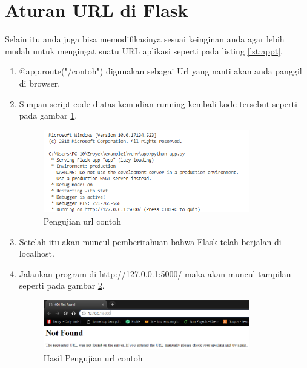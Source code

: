 \section{Aturan URL di Flask}
Selain itu anda juga bisa memodifikasinya sesuai keinginan anda agar lebih mudah untuk mengingat suatu URL aplikasi seperti pada listing \ref{lst:appt}.

\begin{enumerate}
\item @app.route("/contoh") digunakan sebagai Url yang nanti akan anda panggil di browser.
\item Simpan script code diatas kemudian running kembali kode tersebut seperti pada gambar \ref{fig:ujiurl}.
\begin{figure}[!htbp]
	\centerline{\includegraphics[width=0.85\textwidth]{figures/9/ujiurl.PNG}}
	\caption{Pengujian url contoh}
	\label{fig:ujiurl}
\end{figure}

\item Setelah itu akan muncul pemberitahuan bahwa Flask telah berjalan di localhost.
\item Jalankan program di http://127.0.0.1:5000/  maka akan muncul tampilan seperti pada gambar \ref{fig:hujiurl}.
\begin{figure}[!htbp]
	\centerline{\includegraphics[width=0.85\textwidth]{figures/9/hujiurl.PNG}}
	\caption{Hasil Pengujian url contoh}
	\label{fig:hujiurl}
\end{figure}


\end{enumerate}
